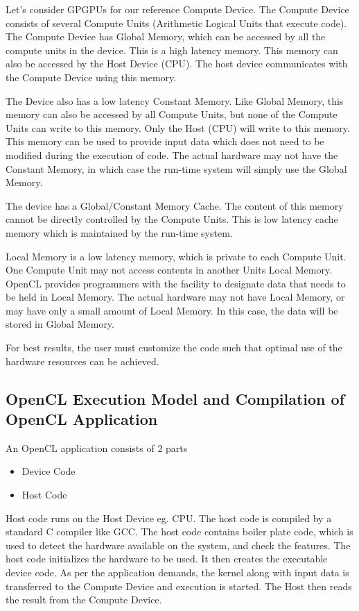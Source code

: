 \documentclass[]{scrartcl}
\begin{document}
Let's consider GPGPUs for our reference Compute Device. The Compute Device consists of
several Compute Units (Arithmetic Logical Units that execute code). The Compute Device has
Global Memory, which can be accessed by all the compute units in the device. This is a high
latency memory. This memory can also be accessed by the Host Device (CPU). The host device
communicates with the Compute Device using this memory.

The Device also has a low latency Constant Memory. Like Global Memory, this memory can also
be accessed by all Compute Units, but none of the Compute Units can write to this memory. 
Only the Host (CPU) will write to this memory. This memory can be used to provide input data
which does not need to be modified during the execution of code. The actual hardware may not
have the Constant Memory, in which case the run-time system will simply use the Global Memory.

The device has a Global/Constant Memory Cache. The content of this memory cannot be directly
controlled by the Compute Units. This is low latency cache memory which is maintained by the
run-time system.

Local Memory is a low latency memory, which is private to each Compute Unit. One Compute Unit
may not access contents in another Units Local Memory. OpenCL provides programmers with the
facility to designate data that needs to be held in Local Memory. The actual hardware may not
have Local Memory, or may have only a small amount of Local Memory. In this case, the data will
be stored in Global Memory. 

For best results, the user must customize the code such that optimal use of the hardware
resources can be achieved.

\pagebreak
\subsection{OpenCL Execution Model and Compilation of OpenCL Application}
An OpenCL application consists of 2 parts
\begin{itemize}
	\item Device Code
	\item Host Code
\end{itemize}
Host code runs on the Host Device eg. CPU. The host code is compiled by a standard C
compiler like GCC. The host code contains boiler plate code, which is used to detect the
hardware available on the system, and check the features. The host code initializes the
hardware to be used. It then creates the executable device code. As per the application
demands, the kernel along with input data is transferred to the Compute Device and execution
is started. The Host then reads the result from the Compute Device.
\end{document}
